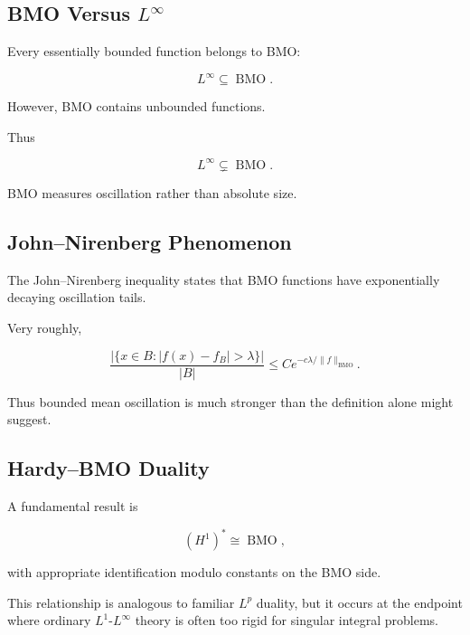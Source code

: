 \subsection{BMO Versus \(L^\infty\)}
\label{subsec:bmo-versus-linfty}

Every essentially bounded function belongs to BMO:

\[
\boxed{
L^\infty
\subseteq
\operatorname{BMO}.
}
\]

However, BMO contains unbounded functions.

Thus

\[
\boxed{
L^\infty
\subsetneq
\operatorname{BMO}.
}
\]

BMO measures oscillation rather than absolute size.

\subsection{John--Nirenberg Phenomenon}
\label{subsec:john-nirenberg}

The John--Nirenberg inequality states that BMO functions have
exponentially decaying oscillation tails.

Very roughly,

\[
\boxed{
\frac{
|\{x\in B:|f(x)-f_B|>\lambda\}|
}{
|B|
}
\leq
C
e^{-c\lambda/\|f\|_{\operatorname{BMO}}}.
}
\]

Thus bounded mean oscillation is much stronger than the definition alone
might suggest.

\subsection{Hardy--BMO Duality}
\label{subsec:hardy-bmo-duality}

A fundamental result is

\[
\boxed{
(H^1)^*
\cong
\operatorname{BMO},
}
\]

with appropriate identification modulo constants on the BMO side.

This relationship is analogous to familiar \(L^p\) duality, but it occurs
at the endpoint where ordinary \(L^1\)-\(L^\infty\) theory is often too
rigid for singular integral problems.

